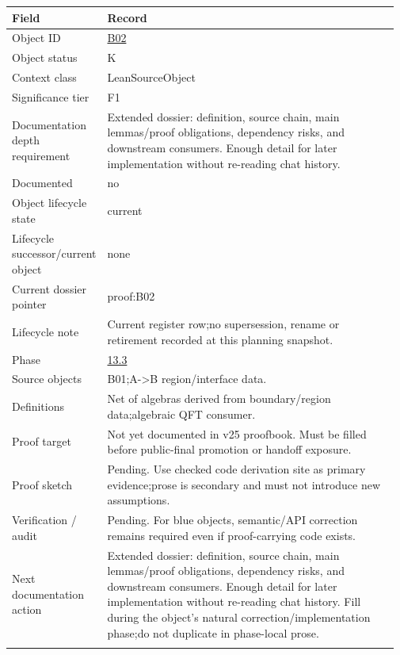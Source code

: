 \begin{longtable}{L{0.16\linewidth} L{0.81\linewidth}}
\hline
\textbf{Field} & \textbf{Record}\\
\hline
Object ID & \hyperlink{object-row-B02}{B02}\\
\hline\addlinespace[0.20em]
Object status & K\\
\hline\addlinespace[0.20em]
Context class & LeanSourceObject\\
\hline\addlinespace[0.20em]
Significance tier & F1\\
\hline\addlinespace[0.20em]
Documentation depth requirement & Extended dossier: definition, source chain, main lemmas/\allowbreak{}proof obligations, dependency risks, and downstream consumers. Enough detail for later implementation without re-reading chat history.\\
\hline\addlinespace[0.20em]
Documented & no\\
\hline\addlinespace[0.20em]
Object lifecycle state & current\\
\hline\addlinespace[0.20em]
Lifecycle successor/\allowbreak{}current object & none\\
\hline\addlinespace[0.20em]
Current dossier pointer & proof:B02\\
\hline\addlinespace[0.20em]
Lifecycle note & Current register row;\newline no supersession, rename or retirement recorded at this planning snapshot.\\
\hline\addlinespace[0.20em]
Phase & \hyperlink{phase-row-13-3}{13.3}\\
\hline\addlinespace[0.20em]
Source objects & B01;\newline A->B region/\allowbreak{}interface data.\\
\hline\addlinespace[0.20em]
Definitions & Net of algebras derived from boundary/\allowbreak{}region data;\newline algebraic QFT consumer.\\
\hline\addlinespace[0.20em]
Proof target & Not yet documented in v25 proofbook. Must be filled before public-final promotion or handoff exposure.\\
\hline\addlinespace[0.20em]
Proof sketch & Pending. Use checked code derivation site as primary evidence;\newline prose is secondary and must not introduce new assumptions.\\
\hline\addlinespace[0.20em]
Verification /\allowbreak{} audit & Pending. For blue objects, semantic/\allowbreak{}API correction remains required even if proof-carrying code exists.\\
\hline\addlinespace[0.20em]
Next documentation action & Extended dossier: definition, source chain, main lemmas/\allowbreak{}proof obligations, dependency risks, and downstream consumers. Enough detail for later implementation without re-reading chat history. Fill during the object's natural correction/\allowbreak{}implementation phase;\newline do not duplicate in phase-local prose.\\
\hline\addlinespace[0.20em]
\end{longtable}
